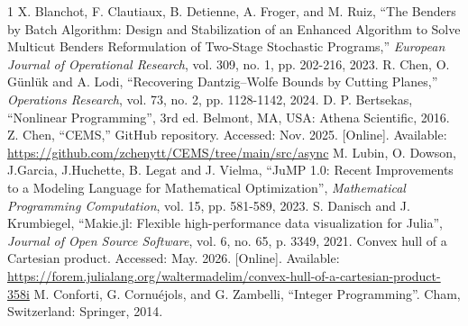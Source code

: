 \documentclass[journal]{IEEEtran}
\begin{document}
\begin{thebibliography}{1}
X. Blanchot, F. Clautiaux, B. Detienne, A. Froger, and M. Ruiz, ``The Benders by Batch Algorithm: Design and Stabilization of an Enhanced Algorithm to Solve Multicut Benders Reformulation of Two-Stage Stochastic Programs,'' \textit{European Journal of Operational Research}, vol. 309, no. 1, pp. 202-216, 2023.
R. Chen, O. Günlük and A. Lodi, ``Recovering Dantzig–Wolfe Bounds by Cutting Planes,'' \textit{Operations Research}, vol. 73, no. 2, pp. 1128-1142, 2024.
D. P. Bertsekas, ``Nonlinear Programming'', 3rd ed. Belmont, MA, USA: Athena Scientific, 2016.
Z. Chen, ``CEMS,'' GitHub repository. Accessed: Nov. 2025. [Online]. Available: \url{https://github.com/zchenytt/CEMS/tree/main/src/async}
M. Lubin, O. Dowson, J.Garcia, J.Huchette, B. Legat and J. Vielma, ``JuMP 1.0: Recent Improvements to a Modeling Language for Mathematical Optimization'', \textit{Mathematical Programming Computation}, vol. 15, pp. 581-589, 2023.
S. Danisch and J. Krumbiegel, ``Makie.jl: Flexible high-performance data visualization for Julia'', \textit{Journal of Open Source Software}, vol. 6, no. 65, p. 3349, 2021.
Convex hull of a Cartesian product. Accessed: May. 2026. [Online]. Available: \url{https://forem.julialang.org/waltermadelim/convex-hull-of-a-cartesian-product-358i}
M. Conforti, G. Cornuéjols, and G. Zambelli, ``Integer Programming''. Cham, Switzerland: Springer, 2014.

\end{thebibliography}
\end{document}
